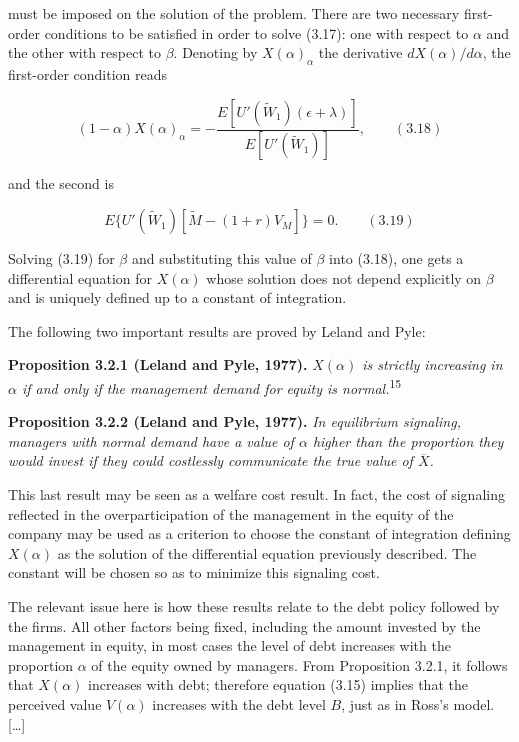\documentclass[11pt,a4paper]{article}
\begin{document}
must be imposed on the solution of the problem. There are two necessary first-order conditions to be
satisfied in order to solve (3.17): one with respect to \(\alpha\) and the other with respect to
\(\beta\). Denoting by \(X(\alpha)_\alpha\) the derivative \(dX(\alpha)/d\alpha\), the first-order
condition reads

\[(1 - \alpha)X(\alpha)_\alpha = -\frac{E[U'(\widetilde{W}_1)(\epsilon + \lambda)]}{E[U'(\widetilde{W}_1)]}, \qquad (3.18)\]

and the second is

\[E\{U'(\widetilde{W}_1)[\widetilde{M} - (1 + r)V_M]\} = 0. \qquad (3.19)\]

Solving (3.19) for \(\beta\) and substituting this value of \(\beta\) into (3.18), one gets a
differential equation for \(X(\alpha)\) whose solution does not depend explicitly on \(\beta\) and
is uniquely defined up to a constant of integration.

The following two important results are proved by Leland and Pyle:

\textbf{Proposition 3.2.1 (Leland and Pyle, 1977).} \emph{\(X(\alpha)\) is strictly increasing in
\(\alpha\) if and only if the management demand for equity is normal.}\textsuperscript{15}

\textbf{Proposition 3.2.2 (Leland and Pyle, 1977).} \emph{In equilibrium signaling, managers with
normal demand have a value of \(\alpha\) higher than the proportion they would invest if they could
costlessly communicate the true value of \(\overline{X}\).}

This last result may be seen as a welfare cost result. In fact, the cost of signaling reflected in
the overparticipation of the management in the equity of the company may be used as a criterion to
choose the constant of integration defining \(X(\alpha)\) as the solution of the differential
equation previously described. The constant will be chosen so as to minimize this signaling cost.

The relevant issue here is how these results relate to the debt policy followed by the firms. All
other factors being fixed, including the amount invested by the management in equity, in most cases
the level of debt increases with the proportion \(\alpha\) of the equity owned by managers. From
Proposition 3.2.1, it follows that \(X(\alpha)\) increases with debt; therefore equation (3.15)
implies that the perceived value \(V(\alpha)\) increases with the debt level \(B\), just as in
Ross's model. {[}\ldots{]}
\end{document}

